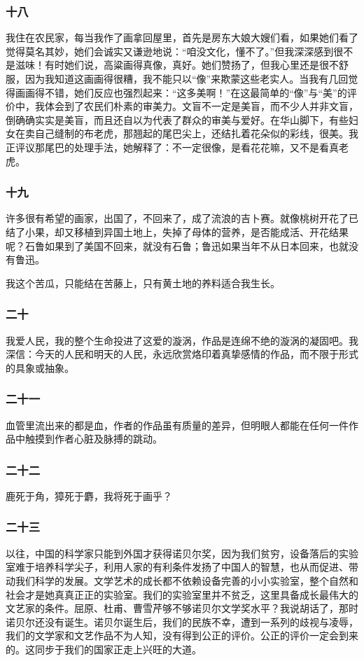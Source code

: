 \documentclass{article}
\begin{document}
\subsubsection{十八}
我住在农民家，每当我作了画拿回屋里，首先是房东大娘大嫂们看，如果她们看了觉得莫名其妙，她们会诚实又谦逊地说：“咱没文化，懂不了。”但我深深感到很不是滋味！有时她们说，高粱画得真像，真好。她们赞扬了，但我心里还是很不舒服，因为我知道这画画得很糟，我不能只以“像”来欺蒙这些老实人。当我有几回觉得画画得不错，她们反应也强烈起来：“这多美啊！”在这最简单的“像”与“美”的评价中，我体会到了农民们朴素的审美力。文盲不一定是美盲，而不少人并非文盲，倒确确实实是美盲，而且还自以为代表了群众的审美与爱好。在华山脚下，有些妇女在卖自己缝制的布老虎，那翘起的尾巴尖上，还结扎着花朵似的彩线，很美。我正评议那尾巴的处理手法，她解释了：不一定很像，是看花花嘛，又不是看真老虎。
\subsubsection{十九}
许多很有希望的画家，出国了，不回来了，成了流浪的吉卜赛。就像桃树开花了已结了小果，却又移植到异国土地上，失掉了母体的营养，是否能成活、开花结果呢？石鲁如果到了美国不回来，就没有石鲁；鲁迅如果当年不从日本回来，也就没有鲁迅。

我这个苦瓜，只能结在苦藤上，只有黄土地的养料适合我生长。
\subsubsection{二十}
我爱人民，我的整个生命投进了这爱的漩涡，作品是连绵不绝的漩涡的凝固吧。我深信：今天的人民和明天的人民，永远欣赏烙印着真挚感情的作品，而不限于形式的具象或抽象。
\subsubsection{二十一}
血管里流出来的都是血，作者的作品虽有质量的差异，但明眼人都能在任何一件作品中触摸到作者心脏及脉搏的跳动。
\subsubsection{二十二}
鹿死于角，獐死于麝，我将死于画乎？
\subsubsection{二十三}
以往，中国的科学家只能到外国才获得诺贝尔奖，因为我们贫穷，设备落后的实验室难于培养科学尖子，利用人家的有利条件发扬了中国人的智慧，也从而促进、带动我们科学的发展。文学艺术的成长都不依赖设备完善的小小实验室，整个自然和社会才是她真真正正的实验室。我们的实验室里并不贫乏，这里具备成长最伟大的文艺家的条件。屈原、杜甫、曹雪芹够不够诺贝尔文学奖水平？我说胡话了，那时诺贝尔还没有诞生。诺贝尔诞生后，我们的民族不幸，遭到一系列的歧视与凌辱，我们的文学家和文艺作品不为人知，没有得到公正的评价。公正的评价一定会到来的。这同步于我们的国家正走上兴旺的大道。
\end{document}
